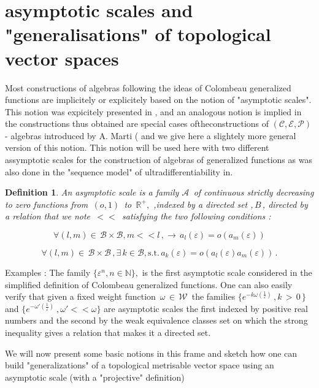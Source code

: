 \documentclass[12pt,a4paper]{amsart}
\newcommand{\NN}{\mathbb N}
\newcommand{\RR}{\mathbb R}
\newtheorem{definition}[theorem]{Definition}
\begin{document}
 
 \section{asymptotic scales and "generalisations" of topological vector spaces}
 
Most constructions of algebras following the ideas of Colombeau 
generalized functions are implicitely or explicitely  based on 
the notion of "asymptotic scales". 
 This notion was expicitely presented in \cite{D.S.1}, 
 \cite{D.S.2} and an analogous notion is implied in 
 \cite{D.H.P.V.}
 the constructions thus obtained are special cases 
 oftheconstructions of $(\mathcal{C},\mathcal{E},\mathcal{P})$-
 algebras introduced by A. Marti (\cite{M.1}
 and we give here a slightely more general  version of this 
 notion.   This notion will be used here with two different 
 assymptotic scales for the construction of algebras of 
 generalized functions as was also done in the "sequence model" 
 of ultradifferentiability in\cite{D.V.V.}.
 
 \begin{definition}
An asymptotic scale is  a family $ \mathcal{A}\,$ 
  of continuous strictly decreasing to zero functions from 
 $\,(o,1)\,$ to $\,\RR^+,$ ,indexed by a directed set ,$\,B\,$, directed by  a relation that we note 
 $\,<< \,$
  satisfying the two following conditions :
 
 $$\forall(l,m) \in \, \mathcal{B} \times\mathcal{B} , 
 m<<l\,, \rightarrow \, a_l(\varepsilon) = o(a_m(\varepsilon))$$
 
 $$ \forall(l,m) \in \, \mathcal{B} \times \mathcal{B} \, ,\exists
 \,k\in \mathcal{B},      \mbox{s.t.} \, a_k(\varepsilon) =  o(a_l(\varepsilon)a_m(\varepsilon))\,.$$


 \end{definition}
 Examples :
 The family $\{\varepsilon^n,n\in\NN \},$ is the first asymptotic scale considered in the simplified definition of Colombeau generalized functions.
 One can also easily verify that given a fixed weight function $\,\omega\,\in \,\mathcal{W}\,$ the families
  $\{e^{-k\omega(\frac{1}{\varepsilon})}\,, k\,>\,0\,\}$                    
 and
 $\{e^{-\omega'(\frac{1}{\varepsilon})}\
 ,\omega'<<\omega \}$ are asymptotic scales the first indexed by positive real numbers and the second by the weak equivalence classes set on which the strong inequality gives a relation that makes it a directed set.
 
 We will now present some basic notions in this frame and sketch how one can build "generalizations" of a topological metrisable  vector space using an asymptotic scale
  (with a "projective" definition)
\end{document}
